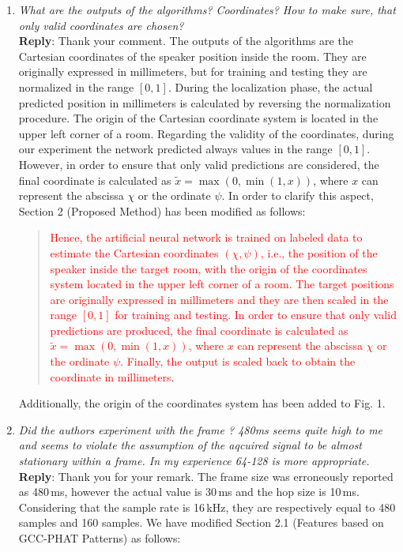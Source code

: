 \documentclass[11pt, technote, letterpaper, oneside, onecolumn]{IEEEtran}
\begin{document}
\begin{enumerate}
\item \textit{What are the outputs of the algorithms? Coordinates? How to make sure, that only valid coordinates are chosen?\\}
\textbf{Reply}: Thank your comment. The outputs of the algorithms are the Cartesian coordinates of the speaker position inside the room. They are originally expressed in millimeters, but for training and testing they are normalized in the range $[0,1]$. During the localization phase, the actual predicted position in millimeters is calculated by reversing the normalization procedure. The origin of the Cartesian coordinate system is located in the upper left corner of a room. Regarding the validity of the coordinates, during our experiment the network predicted always values in the range $[0,1]$. However, in order to ensure that only valid predictions are considered, the final coordinate is calculated as $\tilde{x} =\max(0, \min(1, x))$, where $x$ can represent the abscissa $\chi$ or the ordinate $\psi$.  In order to clarify this aspect, Section 2 (Proposed Method) has been modified as follows:
\begin{quote}
	\textcolor{red}{Hence, the artificial neural network is trained on labeled data to estimate the Cartesian coordinates $\left ( \chi,\psi \right )$, i.e., the position of the speaker inside the target room, with the origin of the coordinates system located in the upper left corner of a room. The target positions are originally expressed in millimeters and they are then scaled in the range $[0,1]$ for training and testing. In order to ensure that only valid predictions are produced, the final coordinate is calculated as $\tilde{x} =\max(0, \min(1, x))$, where $x$ can represent the abscissa $\chi$ or the ordinate $\psi$. Finally, the output is scaled back to obtain the coordinate in millimeters.}
\end{quote}
Additionally, the origin of the coordinates system has been added to Fig. 1.


\item \textit{Did the authors experiment with the frame ? 480ms seems quite high to me and seems to violate the assumption of the aqcuired signal to be almost stationary within a frame. In my experience 64-128 is more appropriate.\\}
\textbf{Reply}: Thank you for your remark. The frame size was erroneously reported as 480\,ms, however the actual value is 30\,ms and the hop size is 10\,ms. Considering that the sample rate is 16\,kHz, they are respectively equal to 480 samples and 160 samples. We have modified Section 2.1 (Features based on GCC-PHAT Patterns) as follows:


\end{enumerate}
\end{document}
